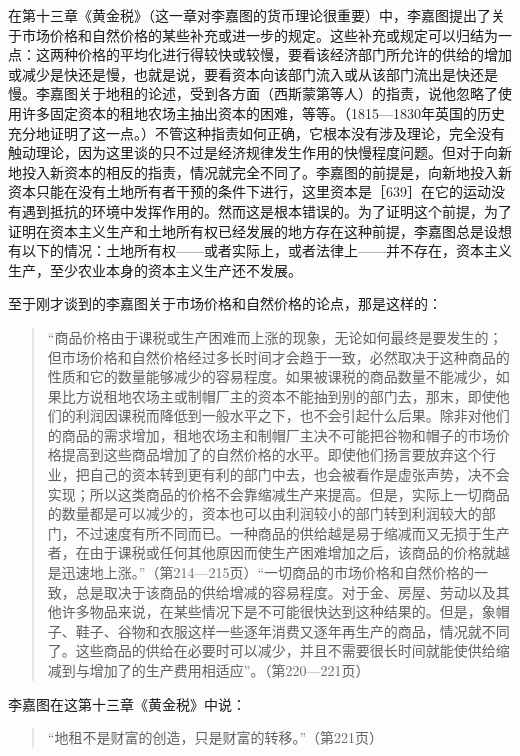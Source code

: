 在第十三章《黄金税》（这一章对李嘉图的货币理论很重要）中，李嘉图提出了关于市场价格和自然价格的某些补充或进一步的规定。这些补充或规定可以归结为一点：这两种价格的平均化进行得较快或较慢，要看该经济部门所允许的供给的增加或减少是快还是慢，也就是说，要看资本向该部门流入或从该部门流出是快还是慢。李嘉图关于地租的论述，受到各方面（西斯蒙第等人）的指责，说他忽略了使用许多固定资本的租地农场主抽出资本的困难，等等。（1815—1830年英国的历史充分地证明了这一点。）不管这种指责如何正确，它根本没有涉及理论，完全没有触动理论，因为这里谈的只不过是经济规律发生作用的快慢程度问题。但对于向新地投入新资本的相反的指责，情况就完全不同了。李嘉图的前提是，向新地投入新资本只能在没有土地所有者干预的条件下进行，这里资本是［639］在它的运动没有遇到抵抗的环境中发挥作用的。然而这是根本错误的。为了证明这个前提，为了证明在资本主义生产和土地所有权已经发展的地方存在这种前提，李嘉图总是设想有以下的情况：土地所有权——或者实际上，或者法律上——并不存在，资本主义生产，至少农业本身的资本主义生产还不发展。

至于刚才谈到的李嘉图关于市场价格和自然价格的论点，那是这样的：

\begin{quote}{“商品价格由于课税或生产困难而上涨的现象，无论如何最终是要发生的；但市场价格和自然价格经过多长时间才会趋于一致，必然取决于这种商品的性质和它的数量能够减少的容易程度。如果被课税的商品数量不能减少，如果比方说租地农场主或制帽厂主的资本不能抽到别的部门去，那末，即使他们的利润因课税而降低到一般水平之下，也不会引起什么后果。除非对他们的商品的需求增加，租地农场主和制帽厂主决不可能把谷物和帽子的市场价格提高到这些商品增加了的自然价格的水平。即使他们扬言要放弃这个行业，把自己的资本转到更有利的部门中去，也会被看作是虚张声势，决不会实现；所以这类商品的价格不会靠缩减生产来提高。但是，实际上一切商品的数量都是可以减少的，资本也可以由利润较小的部门转到利润较大的部门，不过速度有所不同而已。一种商品的供给越是易于缩减而又无损于生产者，在由于课税或任何其他原因而使生产困难增加之后，该商品的价格就越是迅速地上涨。”（第214—215页）“一切商品的市场价格和自然价格的一致，总是取决于该商品的供给增减的容易程度。对于金、房屋、劳动以及其他许多物品来说，在某些情况下是不可能很快达到这种结果的。但是，象帽子、鞋子、谷物和衣服这样一些逐年消费又逐年再生产的商品，情况就不同了。这些商品的供给在必要时可以减少，并且不需要很长时间就能使供给缩减到与增加了的生产费用相适应”。（第220—221页）}\end{quote}


李嘉图在这第十三章《黄金税》中说：

\begin{quote}{“地租不是财富的创造，只是财富的转移。”（第221页）}\end{quote}

